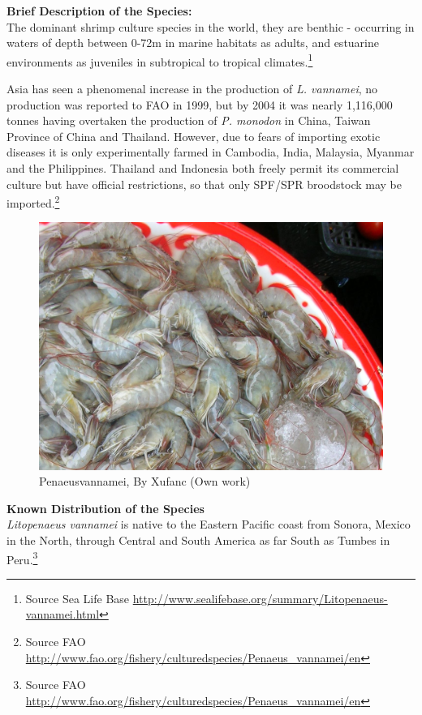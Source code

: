 \documentclass[]{book}
\let\rmarkdownfootnote\footnote%
\def\footnote{\protect\rmarkdownfootnote}
\theoremstyle{definition}
\theoremstyle{definition}
\theoremstyle{definition}
\theoremstyle{remark}
\begin{document}
\textbf{Brief Description of the Species:}\\
The dominant shrimp culture species in the world, they are benthic -
occurring in waters of depth between 0-72m in marine habitats as adults,
and estuarine environments as juveniles in subtropical to tropical
climates.\footnote{Source Sea Life Base
  \url{http://www.sealifebase.org/summary/Litopenaeus-vannamei.html}}

Asia has seen a phenomenal increase in the production of \emph{L.
vannamei}, no production was reported to FAO in 1999, but by 2004 it was
nearly 1,116,000 tonnes having overtaken the production of \emph{P.
monodon} in China, Taiwan Province of China and Thailand. However, due
to fears of importing exotic diseases it is only experimentally farmed
in Cambodia, India, Malaysia, Myanmar and the Philippines. Thailand and
Indonesia both freely permit its commercial culture but have official
restrictions, so that only SPF/SPR broodstock may be imported.\footnote{Source
  FAO
  \url{http://www.fao.org/fishery/culturedspecies/Penaeus_vannamei/en}}

\begin{figure}

{\centering \includegraphics[width=19.69in]{images_species/Litopenaeus_vannamei55} 

}

\caption{Penaeusvannamei, By Xufanc (Own work)}\label{fig:unnamed-chunk-4}
\end{figure}

\textbf{Known Distribution of the Species}\\
\emph{Litopenaeus vannamei} is native to the Eastern Pacific coast from
Sonora, Mexico in the North, through Central and South America as far
South as Tumbes in Peru.\footnote{Source FAO
  \url{http://www.fao.org/fishery/culturedspecies/Penaeus_vannamei/en}}
\end{document}
